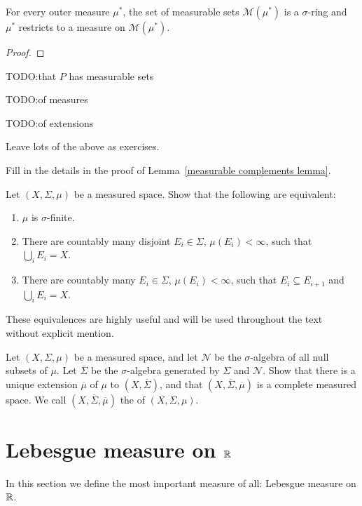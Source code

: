 \begin{lemma}
For every outer measure $\mu^*$, the set of measurable sets $\mathcal M(\mu^*)$ is a $\sigma$-ring and $\mu^*$ restricts to a measure on $\mathcal M(\mu^*)$.
\end{lemma}
\begin{proof}

\end{proof}



TODO:\@Show that $P$ has measurable sets

TODO:\@Completions of measures

TODO:\@Uniqueness of extensions

Leave lots of the above as exercises.

\begin{exercise}\label{measurable complements}
Fill in the details in the proof of Lemma~\ref{measurable complements lemma}.
\end{exercise}

\begin{exercise}
Let $(X, \Sigma, \mu)$ be a measured space. Show that the following are equivalent:
\begin{enumerate}
\item $\mu$ is $\sigma$-finite.
\item There are countably many disjoint $E_{i} \in \Sigma$, $\mu(E_i) < \infty$, such that $\bigcup_{i} E_{i} = X$.
\item There are countably many $E_{i} \in \Sigma$, $\mu(E_i) < \infty$, such that $E_{i} \subseteq E_{i+1}$ and $\bigcup_{i} E_{i} = X$.
\end{enumerate}
These equivalences are highly useful and will be used throughout the text without explicit mention.
\end{exercise}

\begin{exercise}
Let $(X, \Sigma, \mu)$ be a measured space, and let $\mathcal N$ be the $\sigma$-algebra of all null subsets of $\mu$. Let $\overline \Sigma$ be the $\sigma$-algebra generated by $\Sigma$ and $\mathcal N$.
Show that there is a unique extension $\overline \mu$ of $\mu$ to $(X, \overline \Sigma)$, and that $(X, \overline \Sigma, \overline \mu)$ is a complete measured space.
We call $(X, \overline \Sigma, \overline \mu)$ the  of $(X, \Sigma, \mu)$.
\end{exercise}

\section{Lebesgue measure on $\mathbb{R}$}
In this section we define the most important measure of all: Lebesgue measure on $\mathbb{R}$.

